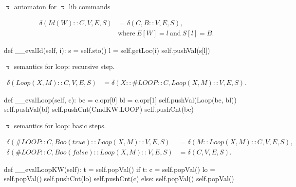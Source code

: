 \documentclass{beamer}
\begin{document}
\begin{frame}{{\color{red}$\uppi$ automaton} for {\color{red}$\uppi$ lib} commands}
\begin{scriptsize}
\begin{align}
\delta(Id(W) :: C, V, E, S) & = \delta(C, B :: V, E, S), \nonumber \\ & \text{where}~ E[W] = l ~\text{and}~ S[l] = B. \nonumber 
\end{align}
\end{scriptsize}
        
\begin{python}
    def __evalId(self, i):
        s = self.sto()
        l = self.getLoc(i)
        self.pushVal(s[l])
\end{python}

\framebreak
       
{\color{red}$\uppi$}  semantics for loop: recursive step.

\begin{scriptsize}
\begin{align}
\delta(Loop(X, M) :: C, V, E, S) & = \delta(X :: \#LOOP :: C, Loop(X, M) :: V, E, S). \nonumber 
\end{align}
\end{scriptsize}
       
\begin{python}
    def __evalLoop(self, c):
        be = c.opr[0]
        bl = c.opr[1]
        self.pushVal(Loop(be, bl))
        self.pushVal(bl)
        self.pushCnt(CmdKW.LOOP)
        self.pushCnt(be)
\end{python}

\framebreak
       
{\color{red}$\uppi$}  semantics for loop: basic steps.

\begin{scriptsize}
\begin{align}
\delta(\#LOOP :: C, Boo(true) :: Loop(X, M) :: V, E, S) & = \delta(M :: Loop(X, M) :: C, V, E, S), \nonumber \\
\delta(\#LOOP :: C, Boo(false) :: Loop(X, M) :: V, E, S) & = \delta(C, V, E, S). \nonumber
\end{align}
\end{scriptsize}
       
\begin{python}
    def __evalLoopKW(self):
        t = self.popVal()
        if t:
            c = self.popVal()
            lo = self.popVal()
            self.pushCnt(lo)
            self.pushCnt(c)
        else:
            self.popVal()
            self.popVal()
\end{python}


\end{frame}
\end{document}
